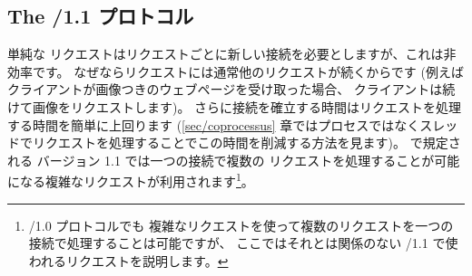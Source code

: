 \subsection*{The {\normalfont \http/1.1} プロトコル}

単純な \http リクエストはリクエストごとに新しい接続を必要としますが、これは非効率です。
なぜならリクエストには通常他のリクエストが続くからです
(例えばクライアントが画像つきのウェブページを受け取った場合、
クライアントは続けて画像をリクエストします)。
さらに接続を確立する時間はリクエストを処理する時間を簡単に上回ります
(\ref{sec/coprocessus} 章ではプロセスではなくスレッドでリクエストを処理することでこの時間を削減する方法を見ます)。
 で規定される \http バージョン 1.1 では一つの接続で複数の
リクエストを処理することが可能になる複雑なリクエストが利用されます\footnote{\http/1.0 プロトコルでも
  複雑なリクエストを使って複数のリクエストを一つの接続で処理することは可能ですが、
  ここではそれとは関係のない \http/1.1 で使われるリクエストを説明します。}。

